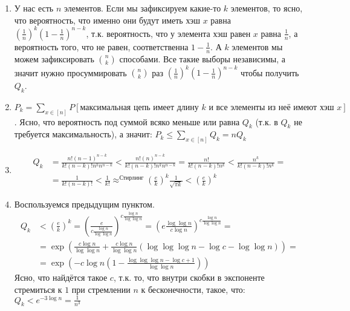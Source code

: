 \begin{solution}
\begin{enumerate}[label=(\alph*)]
\item У нас есть $n$ элементов. Если мы зафиксируем какие-то $k$ элементов, то ясно, что вероятность, что именно они будут иметь хэш $x$ равна $\left(\frac{1}{n}\right)^k\left(1-\frac{1}{n}\right)^{n-k}$, т.к. вероятность, что у элемента хэш равен $x$ равна $\frac{1}{n}$, а вероятность того, что не равен, соответственна $1 - \frac{1}{n}$. А $k$ элементов мы можем зафиксировать ${n \choose k}$ способами. Все такие выборы независимы, а значит нужно просуммировать ${n \choose k}$ раз $\left(\frac{1}{n}\right)^k\left(1-\frac{1}{n}\right)^{n-k}$ чтобы получить $Q_k$. \xqed

\item $P_k = \sum_{x\in [n]}{P[\text{максимальная цепь имеет длину $k$ и все элементы из неё имеют хэш $x$}]}$. Ясно, что вероятность под суммой всяко меньше или равна $Q_k$ (т.к. в $Q_k$ не требуется максимальность), а значит: $P_k \leqslant \sum_{x \in [n]}{Q_k} = nQ_k$ \xqed

\item 
\begin{equation*}
\begin{split}
	Q_k &= \frac{n!(n-1)^{n-k}}{k!(n-k)!n^kn^{n-k}} < \frac{n!(n)^{n-k}}{k!(n-k)!n^kn^{n-k}} = \frac{n!}{k!(n-k)!n^k} < \frac{n^k}{k!(n-k)!n^k} =\\
	    &= \frac{1}{k!(n-k)!} < \frac{1}{k!} \approx^{\text{Стирлинг}} \left(\frac{e}{k}\right)^k\frac{1}{\sqrt{\pi k}} < \left(\frac{e}{k}\right)^k 
\end{split}
\end{equation*}
\xqed

\item Воспользуемся предыдущим пунктом. 
\begin{equation*}
\begin{split}
	Q_k &<  \left(\frac{e}{k}\right)^k = \left(\frac{e}{c \frac{\log{n}}{\log{\log{n}}}}\right)^{c \frac{\log{n}}{\log{\log{n}}}} = \left(e\frac{\log{\log{n}}}{c\log{n}}\right)^{c \frac{\log{n}}{\log{\log{n}}}} =\\
	    &= \exp\left( \frac{c\log{n}}{\log{\log{n}}} + \frac{c\log{n}}{\log{\log{n}}} \left( \log{\log{\log{n}}} - \log{c} - \log{\log{n}} \right)\right) = \\
	    &= \exp\left( -c\log{n}\left(1 - \frac{\log{\log\log{n}} - \log{c} + 1}{\log{\log{n}}}\right)\right)
\end{split}
\end{equation*}
Ясно, что найдётся такое $c$, т.к. то, что внутри скобки в экспоненте стремиться к $1$ при стремлении $n$ к бесконечности, такое, что: $Q_k < e^{-3\log{n}} = \frac{1}{n^3}$ \xqed


\end{enumerate}
\end{solution}
